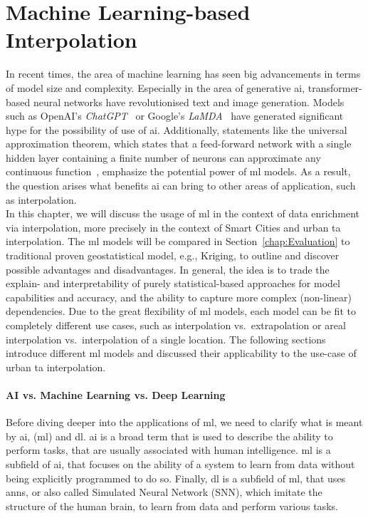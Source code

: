 \chapter{Machine Learning-based Interpolation}
\label{chap:Machine Learning based Interpolation}

In recent times, the area of machine learning has seen big advancements in terms of model size and complexity. Especially in the area of generative \gls{ai}, transformer-based neural networks have revolutionised text and image generation. Models such as OpenAI's \textit{ChatGPT}~\cite{openai2023gpt4} or Google's \textit{LaMDA}~\cite{thoppilan2022lamda} have generated significant hype for the possibility of use of \gls{ai}\@. Additionally, statements like the universal approximation theorem, which states that a feed-forward network with a single hidden layer containing a finite number of neurons can approximate any continuous function~\cite{hornik1989multilayer}, emphasize the potential power of \gls{ml} models. As a result, the question arises what benefits \gls{ai} can bring to other areas of application, such as interpolation.\\
In this chapter, we will discuss the usage of \gls{ml} in the context of data enrichment via interpolation, more precisely in the context of Smart Cities and urban \gls{ta} interpolation. The \gls{ml} models will be compared in Section~\ref{chap:Evaluation} to traditional proven geostatistical model, e.g., Kriging, to outline and discover possible advantages and disadvantages. In general, the idea is to trade the explain- and interpretability of purely statistical-based approaches for model capabilities and accuracy, and the ability to capture more complex (non-linear) dependencies.
Due to the great flexibility of \gls{ml} models, each model can be fit to completely different use cases, such as interpolation vs.\ extrapolation or areal interpolation vs.\ interpolation of a single location. The following sections introduce different \gls{ml} models and discussed their applicability to the use-case of urban \gls{ta} interpolation.

\subsubsection{AI vs. Machine Learning vs. Deep Learning}

Before diving deeper into the applications of \gls{ml}, we need to clarify what is meant by \gls{ai}, (\gls{ml}) and \gls{dl}. \gls{ai} is a broad term that is used to describe the ability to perform tasks, that are usually associated with human intelligence. \gls{ml} is a subfield of \gls{ai}, that focuses on the ability of a system to learn from data without being explicitly programmed to do so. Finally, \gls{dl} is a subfield of \gls{ml}, that uses \gls{ann}s, or also called Simulated Neural Network (SNN), which imitate the structure of the human brain, to learn from data and perform various tasks.

